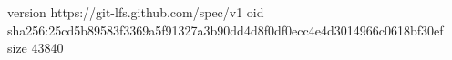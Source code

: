 version https://git-lfs.github.com/spec/v1
oid sha256:25cd5b89583f3369a5f91327a3b90dd4d8f0df0ecc4e4d3014966c0618bf30ef
size 43840
